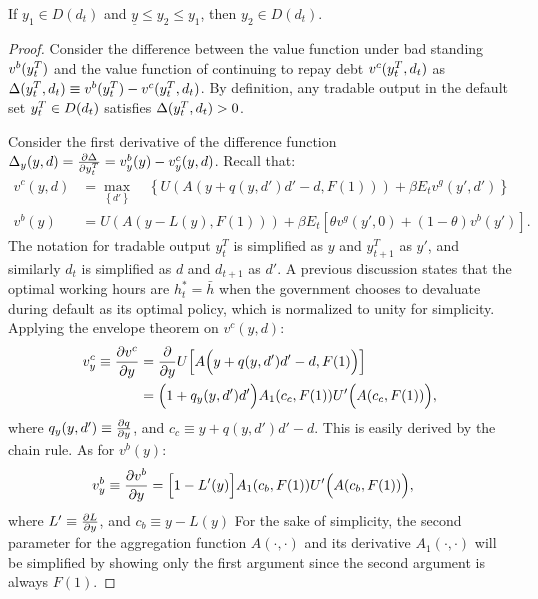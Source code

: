 \begin{proposition}
    \label{prop2}
    If $y_1 \in D(d_t)$ and $\underline{y}\le y_2 \le y_1$, then $y_2 \in D(d_t)$.
\end{proposition}
\begin{proof}
    Consider the difference between the value function under bad standing $v^b(y^T_{t})$ and the value function of continuing to repay debt  $v^c(y^T_{t}, d_t)$ as $\Delta(y^T_{t}, d_t) \equiv v^b(y^T_{t}) - v^c(y^T_{t}, d_t)$. By definition, any tradable output in the default set $y^T_{t} \in D(d_t)$ satisfies $\Delta(y^T_{t}, d_t) >0$.

    Consider the first derivative of the difference function $\Delta_y (y, d) = \pdv{\Delta}{y^T_t} = v^b_{y}(y) - v^c_{y}(y, d)$.
    Recall that:
    \begin{align*}
        v^c(y, d) &= \max_{\left\{d' \right\}} \quad
        \left\{
            U\left(
                A\left( y + q(y, d')d' - d, F(1)\right)
             \right)
             + \beta E_t
             v^g \left(
                y', d'
              \right)
         \right\}\\
        v^b(y) &=
            U\left(
                A\left( y - L(y), F(1)\right)
             \right)
             + \beta E_t \left[
                \theta v^g \left(
                    y', 0
                \right)
                + (1-\theta) v^b \left(
                    y'
                 \right)
            \right].
    \end{align*}
    The notation for tradable output $y^T_t$ is simplified as $y$ and $y^T_{t+1}$ as $y'$, and similarly $d_t$ is simplified as $d$ and $d_{t+1}$ as $d'$. A previous discussion states that the optimal working hours are $h^*_t = \bar{h}$ when the government chooses to devaluate during default as its optimal policy, which is normalized to unity for simplicity. Applying the envelope theorem on $v^c(y, d)$:
    \begin{align*}
        v^c_y \equiv \pdv{v^c}{y} &= \pdv{}{y} U\Big[ A\Big(y + q(y, d')d' - d, F(1)\Big)\Big]\\
        &=\Big(1 + q_y(y, d')d'\Big) A_1(c_c, F(1)) U'\Big(A(c_c, F(1))\Big),
    \end{align*}
    where $q_y(y, d') \equiv \pdv{q}{y}$, and $c_c \equiv y + q(y, d')d' -d$. This is easily derived by the chain rule. As for $v^b(y)$:
    \begin{align*}
        v^b_y \equiv \pdv{v^b}{y} &=
        \Big[ 1 - L' (y)\Big] A_1 (c_b, F(1)) U' \Bigl(A(c_b, F(1))\Bigr),
    \end{align*}
    where $L' \equiv \pdv{L}{y}$, and $c_b \equiv y - L(y)$
    For the sake of simplicity, the second parameter for the aggregation function $A(\cdot, \cdot)$ and its derivative $A_1(\cdot,\cdot )$ will be simplified by showing only the first argument since the second argument is always $F(1)$.


\end{proof}
